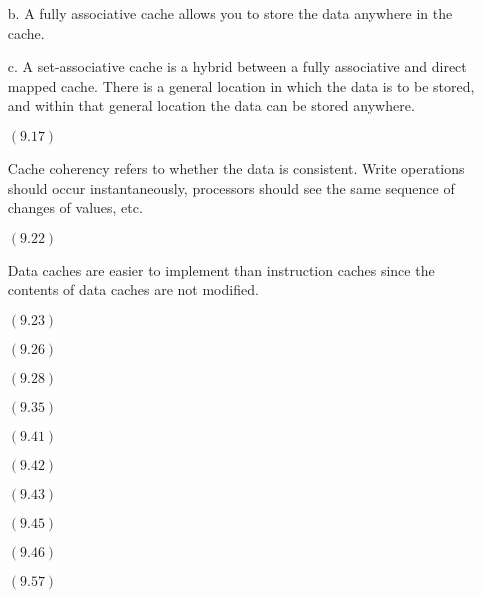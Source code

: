 \documentclass[letterpaper,10pt,titlepage]{article}
\begin{document}
\begin{enumerate}
  b.  A fully associative cache allows you to store the data anywhere in the cache.

  c.  A set-associative cache is a hybrid between a fully associative and direct mapped cache.  There is a general location in which the data is to be stored, and within that general location the data can be stored anywhere.
  
\item[$(9.17)$]

  Cache coherency refers to whether the data is consistent.  Write operations should occur instantaneously, processors should see the same sequence of changes of values, etc.
  
\item[$(9.22)$]

  Data caches are easier to implement than instruction caches since the contents of data caches are not modified.

\item[$(9.23)$]

\item[$(9.26)$]

\item[$(9.28)$]

\item[$(9.35)$]

\item[$(9.41)$]

\item[$(9.42)$]

\item[$(9.43)$]

\item[$(9.45)$]

\item[$(9.46)$]

\item[$(9.57)$]
  
\begin{lstlisting}
\end{lstlisting}
  
\end{enumerate}
\end{document}
